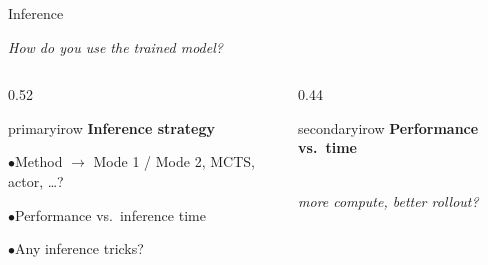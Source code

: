 \documentclass[aspectratio=169]{beamer}
\newcommand{\cardtitle}[2]{\textbf{\color{#1}#2}\par\vspace{5pt}}
\newcommand{\qitem}[1]{\textcolor{secondary}{\footnotesize$\bullet$}\hspace{4pt}#1\par\vspace{3pt}}
\begin{document}
\begin{frame}{Inference}
  \begin{center}
    \small\itshape How do you use the trained model?
  \end{center}
  \vspace{0.35cm}

  \begin{columns}[T]
    \begin{column}{0.52\textwidth}
      \begin{qbox}{primary}{irow}
        \cardtitle{primary}{Inference strategy}
        \footnotesize
        \qitem{Method $\rightarrow$ Mode 1 / Mode 2, MCTS, actor, \ldots?}
        \qitem{Performance vs.\ inference time}
        \qitem{Any inference tricks?}
      \end{qbox}
    \end{column}
    \begin{column}{0.44\textwidth}
      \begin{qbox}{secondary}{irow}
        \cardtitle{secondary}{Performance vs.\ time}
        \centering
        \\[-2pt]
        {\footnotesize\itshape more compute, better rollout?}
      \end{qbox}
    \end{column}
  \end{columns}
\end{frame}
\end{document}
